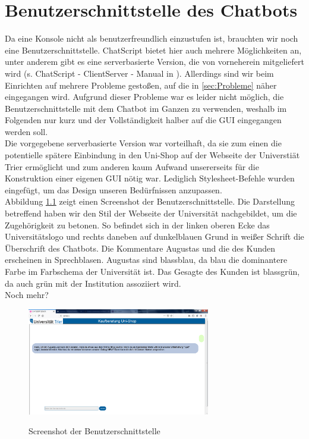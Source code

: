 \chapter{Benutzerschnittstelle des Chatbots}
\label{sec:Benutzerschnittstelle}

Da eine Konsole nicht als benutzerfreundlich einzustufen ist, brauchten wir noch eine Benutzerschnittstelle. ChatScript bietet hier auch mehrere Möglichkeiten an, unter anderem gibt es eine serverbasierte Version, die von vorneherein mitgeliefert wird (s. ChatScript - ClientServer - Manual in \citep{chatscript2019}). Allerdings sind wir beim Einrichten auf mehrere Probleme gestoßen, auf die in \ref{sec:Probleme} näher eingegangen wird. Aufgrund dieser Probleme war es leider nicht möglich, die Benutzerschnittstelle mit dem Chatbot im Ganzen zu verwenden, weshalb im Folgenden nur kurz und der Vollständigkeit halber auf die GUI eingegangen werden soll.\\
Die vorgegebene serverbasierte Version war vorteilhaft, da sie zum einen die potentielle spätere Einbindung in den Uni-Shop auf der Webseite der Universtiät Trier ermöglicht und zum anderen kaum Aufwand unsererseits für die Konstruktion einer eigenen GUI nötig war. Lediglich Stylesheet-Befehle wurden eingefügt, um das Design unseren Bedürfnissen anzupassen.\\
Abbildung \ref{ScreenshotGUI} zeigt einen Screenshot der Benutzerschnittstelle. Die Darstellung betreffend haben wir den Stil der Webseite der Universität nachgebildet, um die Zugehörigkeit zu betonen. So befindet sich in der linken oberen Ecke das Universitätslogo und rechts daneben auf dunkelblauen Grund in weißer Schrift die Überschrift des Chatbots. Die Kommentare Augustas und die des Kunden erscheinen in Sprechblasen. Augustas sind blassblau, da blau die dominantere Farbe im Farbschema der Universität ist. Das Gesagte des Kunden ist blassgrün, da auch grün mit der Institution assoziiert wird.\\

\textcolor[rgb]{1,0,0}{Noch mehr?}


\begin{figure}
\begin{center}
{\includegraphics[width=8cm]{BILDER/gui.png}}
\end{center}
	\caption{Screenshot der Benutzerschnittstelle}
	\label{ScreenshotGUI}
\end{figure}
